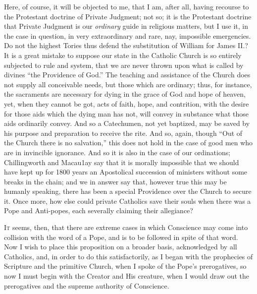 Here, of course, it will be objected to me, that I am, after all,
having recourse to the Protestant doctrine of Private Judgment; not so;
it is the Protestant doctrine that Private Judgment is our \emph{ordinary}
guide in religious matters, but I use it, in the case in question, in
very extraordinary and rare, nay, impossible emergencies. Do not the
highest Tories thus defend the substitution of William for James II.? It
is a great mistake to suppose our state in the Catholic Church is so
entirely subjected to rule and system, that we are never thrown upon
what is called by divines ``the Providence of God.'' The
teaching and assistance of the Church does not supply all conceivable
needs, but those which are ordinary; thus, for instance, the sacraments
are necessary for dying in the grace of God and hope of heaven, yet,
when they cannot be got, acts of faith, hope, and contrition, with the
desire for those aids which the dying man has not, will convey in
substance what those aids ordinarily convey. And so a Catechumen, not
yet baptized, may be saved by his purpose and preparation to receive the
rite. And so, again, though ``Out of the Church there is no
salvation,'' this does not hold in the case of good men who are in
invincible ignorance. And so it is also in the case of our ordinations;
Chillingworth and Macau1ay say that it is morally impossible that we
should have kept up for 1800 years an Apostolical succession of
ministers without some breaks in the chain; and we in answer say that,
however true this may be humanly speaking, there has been a
special Providence over the Church to secure it. Once more, how else
could private Catholics save their souls when there was a Pope and
Anti-popes, each severally claiming their allegiance?


I\textsc{t} seems, then, that there are extreme cases in which
Conscience may come into collision with the word of a Pope, and is to be
followed in spite of that word. Now I wish to place this proposition on
a broader basis, acknowledged by all Catholics, and, in order to do this
satisfactorily, as I began with the prophecies of Scripture and the
primitive Church, when I spoke of the Pope's prerogatives, so now I must
begin with the Creator and His creature, when I would draw out the
prerogatives and the supreme authority of Conscience.

